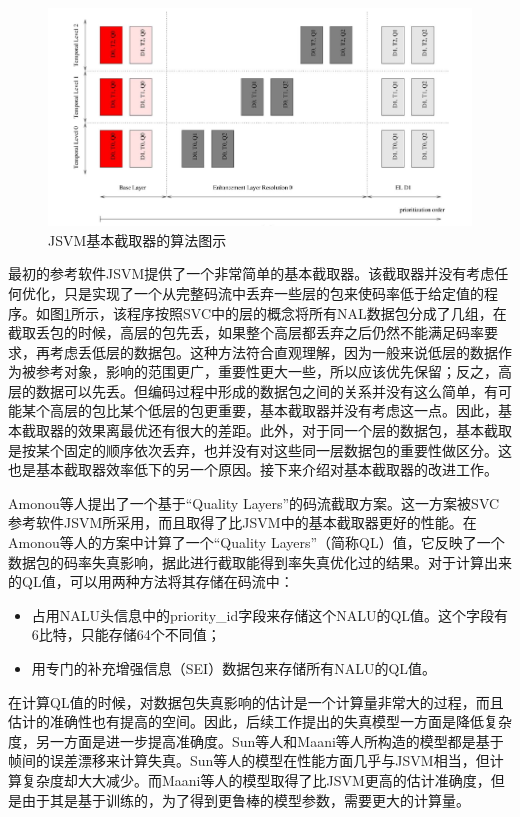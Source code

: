 \begin{figure}[h]
	\centering
	\includegraphics[width = 1.0\linewidth]{clip/06.png}
	\caption{JSVM基本截取器的算法图示\label{fig:06}}
\end{figure}

最初的参考软件JSVM提供了一个非常简单的基本截取器。该截取器并没有考虑任何优化，只是实现了一个从完整码流中丢弃一些层的包来使码率低于给定值的程序。如图\ref{fig:06}所示，该程序按照SVC中的层的概念将所有NAL数据包分成了几组，在截取丢包的时候，高层的包先丢，如果整个高层都丢弃之后仍然不能满足码率要求，再考虑丢低层的数据包。这种方法符合直观理解，因为一般来说低层的数据作为被参考对象，影响的范围更广，重要性更大一些，所以应该优先保留；反之，高层的数据可以先丢。但编码过程中形成的数据包之间的关系并没有这么简单，有可能某个高层的包比某个低层的包更重要，基本截取器并没有考虑这一点。因此，基本截取器的效果离最优还有很大的差距。此外，对于同一个层的数据包，基本截取是按某个固定的顺序依次丢弃，也并没有对这些同一层数据包的重要性做区分。这也是基本截取器效率低下的另一个原因。接下来介绍对基本截取器的改进工作。

Amonou等人\supercite{Amonou2007}提出了一个基于“Quality Layers”的码流截取方案。这一方案被SVC参考软件JSVM所采用，而且取得了比JSVM中的基本截取器更好的性能。在Amonou等人的方案中计算了一个“Quality Layers”（简称QL）值，它反映了一个数据包的码率失真影响，据此进行截取能得到率失真优化过的结果。对于计算出来的QL值，可以用两种方法将其存储在码流中：

\begin{itemize}
\item 占用NALU头信息中的priority\_id字段来存储这个NALU的QL值。这个字段有6比特，只能存储64个不同值；
\item 用专门的补充增强信息（SEI）数据包来存储所有NALU的QL值。
\end{itemize}

在计算QL值的时候，对数据包失真影响的估计是一个计算量非常大的过程，而且估计的准确性也有提高的空间。因此，后续工作提出的失真模型一方面是降低复杂度，另一方面是进一步提高准确度。Sun等人\supercite{Sun2009}和Maani等人\supercite{Maani2009}所构造的模型都是基于帧间的误差漂移来计算失真。Sun等人的模型在性能方面几乎与JSVM相当，但计算复杂度却大大减少。而Maani等人的模型取得了比JSVM更高的估计准确度，但是由于其是基于训练的，为了得到更鲁棒的模型参数，需要更大的计算量。

